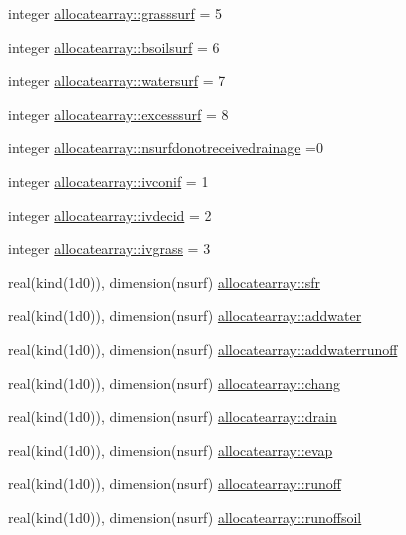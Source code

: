 \begin{DoxyCompactItemize}
\item 
integer \hyperlink{namespaceallocatearray_a414bbbb4213968c827d816bf384610ed}{allocatearray\+::grasssurf} = 5
\item 
integer \hyperlink{namespaceallocatearray_a570d73b34ec4b42f6f6075640a282619}{allocatearray\+::bsoilsurf} = 6
\item 
integer \hyperlink{namespaceallocatearray_ae2de5706788fcce82e02bb4d8f512988}{allocatearray\+::watersurf} = 7
\item 
integer \hyperlink{namespaceallocatearray_a4cc417e12e2821c143a2687fd02be496}{allocatearray\+::excesssurf} = 8
\item 
integer \hyperlink{namespaceallocatearray_af43f469ef09aa8c607146cf31d4c6eaf}{allocatearray\+::nsurfdonotreceivedrainage} =0
\item 
integer \hyperlink{namespaceallocatearray_a808db51d4a8ed78af7b4ea759da827a2}{allocatearray\+::ivconif} = 1
\item 
integer \hyperlink{namespaceallocatearray_a2cb5a7a20d0709bae84bb2339bb5d38f}{allocatearray\+::ivdecid} = 2
\item 
integer \hyperlink{namespaceallocatearray_a4f4900cf0725d3239c9973fc7c48e5ba}{allocatearray\+::ivgrass} = 3
\item 
real(kind(1d0)), dimension(nsurf) \hyperlink{namespaceallocatearray_a22ef94e8f1becc739e9945560050c844}{allocatearray\+::sfr}
\item 
real(kind(1d0)), dimension(nsurf) \hyperlink{namespaceallocatearray_a01b956e9e6112af17136ffd957d4c481}{allocatearray\+::addwater}
\item 
real(kind(1d0)), dimension(nsurf) \hyperlink{namespaceallocatearray_aa390fe06fd3fcecf38ff94ac0367e04c}{allocatearray\+::addwaterrunoff}
\item 
real(kind(1d0)), dimension(nsurf) \hyperlink{namespaceallocatearray_a2c176341a882c22aab3f1b01844f4fa0}{allocatearray\+::chang}
\item 
real(kind(1d0)), dimension(nsurf) \hyperlink{namespaceallocatearray_aeaa22bcbc221cc3e0ca82aa0ac739fd3}{allocatearray\+::drain}
\item 
real(kind(1d0)), dimension(nsurf) \hyperlink{namespaceallocatearray_a91095edf69a936902a3586fe9ef958a3}{allocatearray\+::evap}
\item 
real(kind(1d0)), dimension(nsurf) \hyperlink{namespaceallocatearray_abf84199761d02e1a9304d1d7a2c00eba}{allocatearray\+::runoff}
\item 
real(kind(1d0)), dimension(nsurf) \hyperlink{namespaceallocatearray_a56dec28d9173b960574b82696b82f7a2}{allocatearray\+::runoffsoil}

\end{DoxyCompactItemize}
